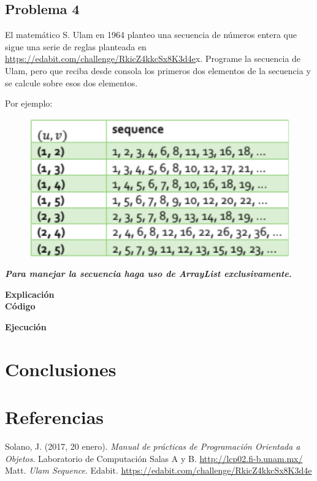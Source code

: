 \documentclass[11pt, twocolumn]{article}
\newcommand{\linejump}{\hfill \break}
\begin{document}
  \subsection*{Problema 4}
  El matemático S. Ulam en 1964 planteo una secuencia de números entera que sigue una serie de reglas planteada en \url{https://edabit.com/challenge/RkicZ4kkcSx8K3d4e}x. Programe la secuencia de Ulam, pero que reciba desde consola los primeros dos elementos de la secuencia y se calcule sobre esos dos elementos.

  Por ejemplo:
  \begin{figure}[ht]
      \includegraphics[width=0.8\columnwidth, center]{secuencia.png}
  \end{figure}

  \textbf{\textit{Para manejar la secuencia haga uso de ArrayList exclusivamente.}}

  \linejump
  \textbf{Explicación} \\


  \textbf{Código}
    

  \textbf{Ejecución}

  \section*{Conclusiones}
  

  \section*{Referencias}
  \small
  Solano, J. (2017, 20 enero). \textit{Manual de prácticas de Programación Orientada a Objetos}. Laboratorio de Computación Salas A y B. \url{http://lcp02.fi-b.unam.mx/} \\

  Matt. \textit{Ulam Sequence}. Edabit. \url{https://edabit.com/challenge/RkicZ4kkcSx8K3d4e}
\end{document}
